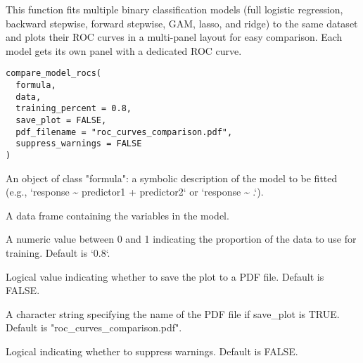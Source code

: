 \documentclass[a4paper]{book}
\begin{document}
%
\begin{Description}
This function fits multiple binary classification models (full logistic regression, backward stepwise,
forward stepwise, GAM, lasso, and ridge) to the same dataset and plots their ROC curves 
in a multi-panel layout for easy comparison. Each model gets its own panel with a dedicated ROC curve.
\end{Description}
%
\begin{Usage}
\begin{verbatim}
compare_model_rocs(
  formula,
  data,
  training_percent = 0.8,
  save_plot = FALSE,
  pdf_filename = "roc_curves_comparison.pdf",
  suppress_warnings = FALSE
)
\end{verbatim}
\end{Usage}
%
\begin{Arguments}
\begin{ldescription}
\item[\code{formula}] An object of class \bsl{}"formula\bsl{}": a symbolic description of the
model to be fitted (e.g., `response \textasciitilde{} predictor1 + predictor2` or `response \textasciitilde{} .`).

\item[\code{data}] A data frame containing the variables in the model.

\item[\code{training\_percent}] A numeric value between 0 and 1 indicating the proportion
of the data to use for training. Default is `0.8`.

\item[\code{save\_plot}] Logical value indicating whether to save the plot to a PDF file.
Default is FALSE.

\item[\code{pdf\_filename}] A character string specifying the name of the PDF file if
save\_plot is TRUE. Default is "roc\_curves\_comparison.pdf".

\item[\code{suppress\_warnings}] Logical indicating whether to suppress warnings. Default is FALSE.
\end{ldescription}
\end{Arguments}
\end{document}
